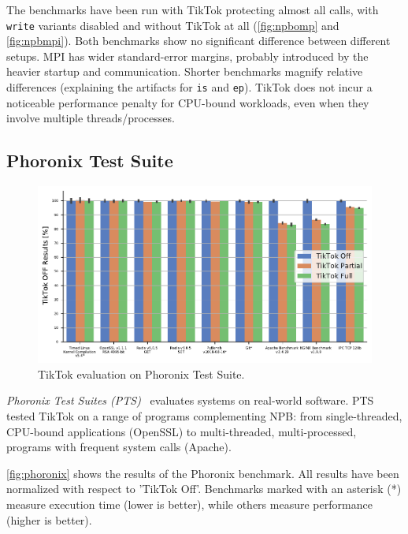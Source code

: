 \documentclass[conference]{IEEEtran}
\newcommand{\sysname}{TikTok}
\begin{document}
The benchmarks have been run with \sysname{} protecting almost all calls, with
\texttt{write} variants disabled and without \sysname{} at all
(\autoref{fig:npbomp} and \autoref{fig:npbmpi}). Both benchmarks show no
significant difference between different setups. MPI has wider standard-error
margins, probably introduced by the heavier startup and communication. Shorter
benchmarks magnify relative differences (explaining the artifacts for
\texttt{is} and \texttt{ep}). \sysname{} does not incur a noticeable performance
penalty for CPU-bound workloads, even when they involve multiple
threads/processes.


\subsection{Phoronix Test Suite} \label{subsec:phoronix}

\begin{figure}[]
  \centering
  \includegraphics[width=\linewidth]{img/eval.pdf}
  \caption{\sysname{} evaluation on Phoronix Test Suite.
}
  \label{fig:phoronix}
\end{figure}

\emph{Phoronix Test Suites (PTS)}~\cite{pts} evaluates systems on real-world
software. PTS tested \sysname{} on a range of programs complementing NPB:
from single-threaded, CPU-bound applications (OpenSSL) to multi-threaded,
multi-processed, programs with frequent system calls (Apache).

\autoref{fig:phoronix} shows the results of the Phoronix benchmark. All results
have been normalized with respect to '\sysname{} Off'. Benchmarks marked
with an asterisk (*) measure execution time (lower is better), while others
measure performance (higher is better).
\end{document}
